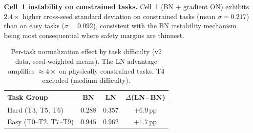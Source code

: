 \textbf{Cell~1 instability on constrained tasks.} Cell~1 (BN + gradient ON) exhibits $2.4{\times}$ higher cross-seed standard deviation on constrained tasks (mean $\sigma{=}0.217$) than on easy tasks ($\sigma{=}0.092$), consistent with the BN instability mechanism being most consequential where safety margins are thinnest.

\begin{table}[h]
\centering
\caption{Per-task normalization effect by task difficulty (v2 data, seed-weighted means). The LN advantage amplifies ${\approx}4{\times}$ on physically constrained tasks. T4 excluded (medium difficulty).}
\label{tab:per_task_norm}
\small
\begin{tabular}{lccc}
\toprule
Task Group & BN & LN & $\Delta$(LN$-$BN) \\
\midrule
Hard (T3, T5, T6) & $0.288$ & $0.357$ & $+6.9$\,pp \\
Easy (T0--T2, T7--T9) & $0.945$ & $0.962$ & $+1.7$\,pp \\
\bottomrule
\end{tabular}
\end{table}

